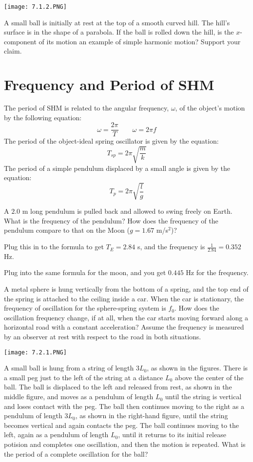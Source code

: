 \documentclass[../mech.tex]{subfiles}
\begin{document}
\ex \begin{center}
    \texttt{[image: 7.1.2.PNG]}
\end{center}
A small ball is initially at rest at the top of a smooth curved hill. The hill's surface is in the shape of a parabola. If the ball is rolled down the hill, is the $x$-component of its motion an example of simple harmonic motion? Support your claim.

\section{Frequency and Period of SHM}
The period of SHM is related to the angular frequency, $\omega$, of the object's motion by the following equation:
\[ \omega = \frac{2\pi}{T} \qquad \omega = 2\pi f \]
The period of the object-ideal spring oscillator is given by the equation:
\[ T_{sp}=2\pi \sqrt{\frac{m}{k}} \]
The period of a simple pendulum displaced by a small angle is given by the equation:
\[ T_{p}=2\pi \sqrt{\frac{l}{g}} \]

\begin{example}
    A $2.0$ m long pendulum is pulled back and allowed to swing freely on Earth. What is the frequency of the pendulum? How does the frequency of the pendulum compare to that on the Moon ($g=1.67$ m/s$^2$)?

    Plug this in to the formula to get $T_E=2.84$ s, and the frequency is $\frac{1}{2.84} = 0.352$ Hz.

    Plug into the same formula for the moon, and you get $0.445$ Hz for the frequency.
\end{example}

\ex A metal sphere is hung vertically from the bottom of a spring, and the top end of the spring is attached to the ceiling inside a car. When the car is stationary, the frequency of oscillation for the sphere-spring system is $f_0$. How does the oscillation frequency change, if at all, when the car 
starts moving forward along a horizontal road with a constant acceleration? Assume the frequency is measured by an observer at rest with respect to the road in both situations.

\ex \begin{center}
    \texttt{[image: 7.2.1.PNG]}
\end{center}
A small ball is hung from a string of length $3L_0$, as shown in the figures. There is a small peg just to the left of the string at a distance $L_0$ above the center of the ball. The ball is displaced to the left and released from rest, as shown in the middle figure, and moves 
as a pendulum of length $L_0$ until the string is vertical and loses contact with the peg. The ball then continues moving to the right as a pendulum of length $3L_0$, as shown in the right-hand figure, until the string becomes vertical and again contacts the peg. The ball continues moving to the left, 
again as a pendulum of length $L_0$, until it returns to its initial release potision and completes one oscillation, and then the motion is repeated. What is the period of a complete oscillation for the ball?
\end{document}
